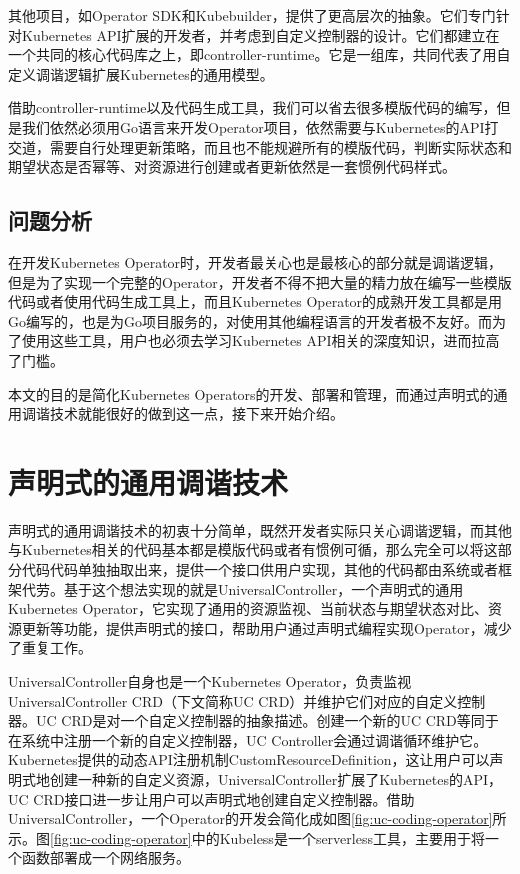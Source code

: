 \documentclass[macfonts,master]{njuthesis}
\begin{document}
其他项目，如Operator SDK和Kubebuilder，提供了更高层次的抽象。它们专门针对Kubernetes API扩展的开发者，并考虑到自定义控制器的设计。它们都建立在一个共同的核心代码库之上，即controller-runtime\cite{k8s-sigs}。它是一组库，共同代表了用自定义调谐逻辑扩展Kubernetes的通用模型\cite{controllerruntimedoc}\cite{k8s-sigs}。


借助controller-runtime以及代码生成工具，我们可以省去很多模版代码的编写，但是我们依然必须用Go语言来开发Operator项目，依然需要与Kubernetes的API打交道，需要自行处理更新策略，而且也不能规避所有的模版代码，判断实际状态和期望状态是否幂等、对资源进行创建或者更新依然是一套惯例代码样式。

\subsection{问题分析}

在开发Kubernetes Operator时，开发者最关心也是最核心的部分就是调谐逻辑，但是为了实现一个完整的Operator，开发者不得不把大量的精力放在编写一些模版代码或者使用代码生成工具上，而且Kubernetes Operator的成熟开发工具都是用Go编写的，也是为Go项目服务的，对使用其他编程语言的开发者极不友好。而为了使用这些工具，用户也必须去学习Kubernetes API相关的深度知识，进而拉高了门槛。

本文的目的是简化Kubernetes Operators的开发、部署和管理，而通过声明式的通用调谐技术就能很好的做到这一点，接下来开始介绍。


\section{声明式的通用调谐技术}

声明式的通用调谐技术的初衷十分简单，既然开发者实际只关心调谐逻辑，而其他与Kubernetes相关的代码基本都是模版代码或者有惯例可循，那么完全可以将这部分代码代码单独抽取出来，提供一个接口供用户实现，其他的代码都由系统或者框架代劳。基于这个想法实现的就是UniversalController，一个声明式的通用Kubernetes Operator，它实现了通用的资源监视、当前状态与期望状态对比、资源更新等功能，提供声明式的接口，帮助用户通过声明式编程实现Operator，减少了重复工作。

UniversalController自身也是一个Kubernetes Operator，负责监视UniversalController CRD（下文简称UC CRD）并维护它们对应的自定义控制器。UC CRD是对一个自定义控制器的抽象描述。创建一个新的UC CRD等同于在系统中注册一个新的自定义控制器，UC Controller会通过调谐循环维护它。Kubernetes提供的动态API注册机制CustomResourceDefinition，这让用户可以声明式地创建一种新的自定义资源，UniversalController扩展了Kubernetes的API，UC CRD接口进一步让用户可以声明式地创建自定义控制器。借助UniversalController，一个Operator的开发会简化成如图\ref{fig:uc-coding-operator}所示。图\ref{fig:uc-coding-operator}中的Kubeless是一个serverless工具，主要用于将一个函数部署成一个网络服务。
\end{document}
